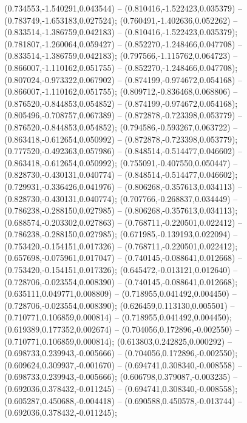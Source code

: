  (0.734553,-1.540291,0.043544) -- (0.810416,-1.522423,0.035379) -- (0.783749,-1.653183,0.027524);
 (0.760491,-1.402636,0.052262) -- (0.833514,-1.386759,0.042183) -- (0.810416,-1.522423,0.035379);
 (0.781807,-1.260064,0.059427) -- (0.852270,-1.248466,0.047708) -- (0.833514,-1.386759,0.042183);
 (0.797566,-1.115762,0.064723) -- (0.866007,-1.110162,0.051755) -- (0.852270,-1.248466,0.047708);
 (0.807024,-0.973322,0.067902) -- (0.874199,-0.974672,0.054168) -- (0.866007,-1.110162,0.051755);
 (0.809712,-0.836468,0.068806) -- (0.876520,-0.844853,0.054852) -- (0.874199,-0.974672,0.054168);
 (0.805496,-0.708757,0.067389) -- (0.872878,-0.723398,0.053779) -- (0.876520,-0.844853,0.054852);
 (0.794586,-0.593267,0.063722) -- (0.863418,-0.612654,0.050992) -- (0.872878,-0.723398,0.053779);
 (0.777520,-0.492363,0.057986) -- (0.848514,-0.514477,0.046602) -- (0.863418,-0.612654,0.050992);
 (0.755091,-0.407550,0.050447) -- (0.828730,-0.430131,0.040774) -- (0.848514,-0.514477,0.046602);
 (0.729931,-0.336426,0.041976) -- (0.806268,-0.357613,0.034113) -- (0.828730,-0.430131,0.040774);
 (0.707766,-0.268837,0.034449) -- (0.786238,-0.288150,0.027985) -- (0.806268,-0.357613,0.034113);
 (0.688574,-0.203302,0.027863) -- (0.768711,-0.220501,0.022412) -- (0.786238,-0.288150,0.027985);
 (0.671985,-0.139193,0.022094) -- (0.753420,-0.154151,0.017326) -- (0.768711,-0.220501,0.022412);
 (0.657698,-0.075961,0.017047) -- (0.740145,-0.088641,0.012668) -- (0.753420,-0.154151,0.017326);
 (0.645472,-0.013121,0.012640) -- (0.728706,-0.023554,0.008390) -- (0.740145,-0.088641,0.012668);
 (0.635111,0.049771,0.008809) -- (0.718955,0.041492,0.004450) -- (0.728706,-0.023554,0.008390);
 (0.626459,0.113130,0.005501) -- (0.710771,0.106859,0.000814) -- (0.718955,0.041492,0.004450);
 (0.619389,0.177352,0.002674) -- (0.704056,0.172896,-0.002550) -- (0.710771,0.106859,0.000814);
 (0.613803,0.242825,0.000292) -- (0.698733,0.239943,-0.005666) -- (0.704056,0.172896,-0.002550);
 (0.609624,0.309937,-0.001670) -- (0.694741,0.308340,-0.008558) -- (0.698733,0.239943,-0.005666);
 (0.606798,0.379087,-0.003235) -- (0.692036,0.378432,-0.011245) -- (0.694741,0.308340,-0.008558);
 (0.605287,0.450688,-0.004418) -- (0.690588,0.450578,-0.013744) -- (0.692036,0.378432,-0.011245);
